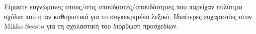 \documentclass[journal,12pt,onecolumn]{article}
\begin{document}
\noindent \foreignlanguage{greek}{Είμαστε ευγνώμονες στους/στις σπουδαστές/σπουδάστριες που παρείχαν 
πολύτιμα σχόλια που ήταν καθοριστικά για το συγκεκριμένο λεξικό. Ιδιαίτερες ευχαριστίες στον} Mikko 
Seesto \foreignlanguage{greek}{για τη σχολαστική του διόρθωση προσχεδίων}.



\newpage 


\newpage

\glsaddall



\printunsrtglossary[title={\foreignlanguage{greek}{Έννοιες Μηχανικής Μάθησης}}, nonumberlist]

\printglossary[type=systems, title={Machine Learning Systems}, nonumberlist]


\newpage
{}
\pagestyle{empty}  %
\printindex  %




\newpage


\end{document}
